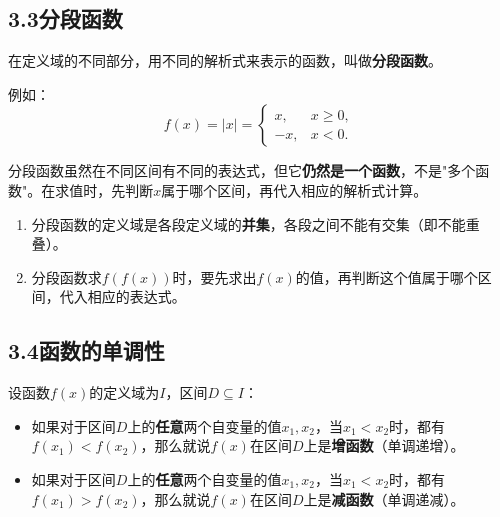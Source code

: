 \documentclass[12pt, a4paper]{ctexart}
\begin{document}
\subsection*{3.3\quad 分段函数}

\begin{knowledgebox}[分段函数的定义]
在定义域的不同部分，用不同的解析式来表示的函数，叫做\textbf{分段函数}。

例如：
\[
f(x) = |x| =
\begin{cases}
x,  & x \geq 0, \\
-x, & x < 0.
\end{cases}
\]

分段函数虽然在不同区间有不同的表达式，但它\textbf{仍然是一个函数}，不是"多个函数"。在求值时，先判断$x$属于哪个区间，再代入相应的解析式计算。
\end{knowledgebox}

\begin{warnbox}[易错提醒]
\begin{enumerate}[leftmargin=2em]
  \item 分段函数的定义域是各段定义域的\textbf{并集}，各段之间不能有交集（即不能重叠）。
  \item 分段函数求$f(f(x))$时，要先求出$f(x)$的值，再判断这个值属于哪个区间，代入相应的表达式。
\end{enumerate}
\end{warnbox}

\subsection*{3.4\quad 函数的单调性}

\begin{knowledgebox}[单调性的定义]
设函数$f(x)$的定义域为$I$，区间$D \subseteq I$：
\begin{itemize}[leftmargin=2em]
  \item 如果对于区间$D$上的\textbf{任意}两个自变量的值$x_1, x_2$，当$x_1 < x_2$时，都有$f(x_1) < f(x_2)$，那么就说$f(x)$在区间$D$上是\textbf{增函数}（单调递增）。
  \item 如果对于区间$D$上的\textbf{任意}两个自变量的值$x_1, x_2$，当$x_1 < x_2$时，都有$f(x_1) > f(x_2)$，那么就说$f(x)$在区间$D$上是\textbf{减函数}（单调递减）。
\end{itemize}
\end{knowledgebox}
\end{document}
